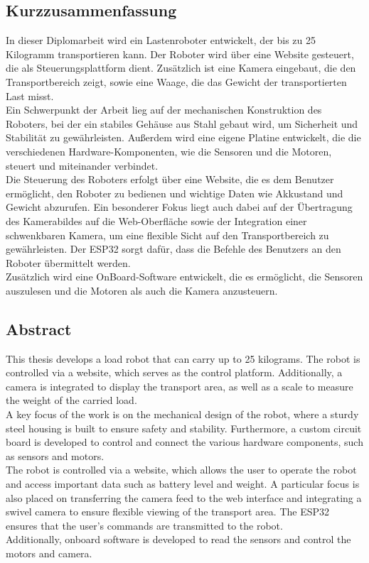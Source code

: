 \documentclass[ngerman,12pt,a4paper]{article}
\begin{document}
	\subsection{Kurzzusammenfassung}
	In dieser Diplomarbeit wird ein Lastenroboter entwickelt, der bis zu 25 Kilogramm transportieren kann. Der Roboter wird über eine Website gesteuert, die als Steuerungsplattform dient. Zusätzlich ist eine Kamera eingebaut, die den Transportbereich zeigt, sowie eine Waage, die das Gewicht der transportierten Last misst.\\[0.5 cm]
	Ein Schwerpunkt der Arbeit lieg auf der mechanischen Konstruktion des Roboters, bei der ein stabiles Gehäuse aus Stahl gebaut wird, um Sicherheit und Stabilität zu gewährleisten. Außerdem wird eine eigene Platine entwickelt, die die verschiedenen Hardware-Komponenten, wie die Sensoren und die Motoren, steuert und miteinander verbindet.\\[0.5 cm]
	Die Steuerung des Roboters erfolgt über eine Website, die es dem Benutzer ermöglicht, den Roboter zu bedienen und wichtige Daten wie Akkustand und Gewicht abzurufen. Ein besonderer Fokus liegt auch dabei auf der Übertragung des Kamerabildes auf die Web-Oberfläche sowie der Integration einer schwenkbaren Kamera, um eine flexible Sicht auf den Transportbereich zu gewährleisten. Der ESP32 sorgt dafür, dass die Befehle des Benutzers an den Roboter übermittelt werden.\\[0.5 cm]
	Zusätzlich wird eine OnBoard-Software entwickelt, die es ermöglicht, die Sensoren auszulesen und die Motoren als auch die Kamera anzusteuern.\\[0.5 cm]
	
	\newpage
	
	\subsection{Abstract}
	
	This thesis develops a load robot that can carry up to 25 kilograms. The robot is controlled via a website, which serves as the control platform. Additionally, a camera is integrated to display the transport area, as well as a scale to measure the weight of the carried load.\\[0.5 cm]
	A key focus of the work is on the mechanical design of the robot, where a sturdy steel housing is built to ensure safety and stability. Furthermore, a custom circuit board is developed to control and connect the various hardware components, such as sensors and motors.\\[0.5 cm]
	The robot is controlled via a website, which allows the user to operate the robot and access important data such as battery level and weight. A particular focus is also placed on transferring the camera feed to the web interface and integrating a swivel camera to ensure flexible viewing of the transport area. The ESP32 ensures that the user's commands are transmitted to the robot.\\[0.5 cm]
	Additionally, onboard software is developed to read the sensors and control the motors and camera.
	\thispagestyle{fancy}
	\newpage
\end{document}

